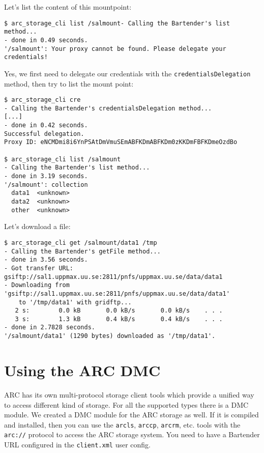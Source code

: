 \documentclass{book}
\begin{document}
Let's list the content of this mountpoint:

\begin{verbatim}
$ arc_storage_cli list /salmount- Calling the Bartender's list method...
- done in 0.49 seconds.
'/salmount': Your proxy cannot be found. Please delegate your credentials!
\end{verbatim}

Yes, we first need to delegate our credentials with the \verb!credentialsDelegation! method, then try to list the mount point:

\begin{verbatim}
$ arc_storage_cli cre
- Calling the Bartender's credentialsDelegation method...
[...]
- done in 0.42 seconds.
Successful delegation.
Proxy ID: eNCMDmi8i6YnPSAtDmVmuSEmABFKDmABFKDm0zKKDmFBFKDmeOzdBo

$ arc_storage_cli list /salmount
- Calling the Bartender's list method...
- done in 3.19 seconds.
'/salmount': collection
  data1  <unknown>
  data2  <unknown>
  other  <unknown>
\end{verbatim}

Let's download a file:

\begin{verbatim}
$ arc_storage_cli get /salmount/data1 /tmp
- Calling the Bartender's getFile method...
- done in 3.56 seconds.
- Got transfer URL: gsiftp://sal1.uppmax.uu.se:2811/pnfs/uppmax.uu.se/data/data1
- Downloading from 'gsiftp://sal1.uppmax.uu.se:2811/pnfs/uppmax.uu.se/data/data1'
    to '/tmp/data1' with gridftp...
   2 s:        0.0 kB       0.0 kB/s       0.0 kB/s    . . .       
   3 s:        1.3 kB       0.4 kB/s       0.4 kB/s    . . .       
- done in 2.7828 seconds.
'/salmount/data1' (1290 bytes) downloaded as '/tmp/data1'.
\end{verbatim}

\section{Using the ARC DMC} %
\label{sec:using_the_arc_dmc}

ARC has its own multi-protocol storage client tools which provide a unified way to access different kind of storage. For all the supported types there is a DMC module. We created a DMC module for the ARC storage as well. If it is compiled and installed, then you can use the \verb!arcls!, \verb!arccp!, \verb!arcrm!, etc. tools with the \verb!arc://! protocol to access the ARC storage system. You need to have a Bartender URL configured in the \verb!client.xml! user config.
\end{document}
